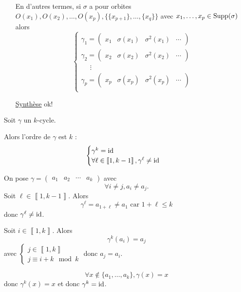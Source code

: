 \begin{prv}
\begin{itemize}
			En d'autres termes, si $\sigma$ a pour orbites $O(x_1), O(x_2), \ldots, O(x_p), \{\{x_{p+1}\},\ldots, \{x_q\}\}$ avec $x_1, \ldots, x_p \in \operatorname{Supp}(\sigma)$ alors \[
				\begin{cases}
					\gamma_1 = \begin{pmatrix} x_1&\sigma(x_1)&\sigma^2(x_1)&\cdots \end{pmatrix} \\
					\gamma_2 = \begin{pmatrix} x_2&\sigma(x_2)&\sigma^2(x_2)&\cdots \end{pmatrix}\\
					~~~~~~\vdots\\
					\gamma_p = \begin{pmatrix} x_p&\sigma(x_p)&\sigma^2(x_p)&\cdots \end{pmatrix} \\
				\end{cases}
			\]
		\item[\underline{\sc Synthèse}] ok!
	\end{itemize}
\end{prv}

\begin{prop}
	Soit $\gamma$ un $k$-cycle.

	Alors l'ordre de $\gamma$ est $k$ : \[
		\begin{cases}
			\gamma^{k}= \operatorname{id}\\
			\forall \ell \in \left\llbracket 1,k-1 \right\rrbracket, \gamma^{\ell} \neq \operatorname{id}
		\end{cases}
	\]
\end{prop}

\begin{prv}
	On pose $\gamma = \begin{pmatrix}
		a_1&a_2&\cdots&a_k
	\end{pmatrix}$ avec \[
		\forall i \neq j, a_i \neq a_j.
	\] Soit $\ell \in \left\llbracket 1,k-1 \right\rrbracket$. Alors \[
		\gamma^{\ell} = a_{1+\ell} \neq a_1 \text{ car } 1 + \ell \le k
	\] donc $\gamma^{\ell} \neq \operatorname{id}$.

	Soit $i \in \left\llbracket 1,k \right\rrbracket$. Alors \[
		\gamma^{k}(a_i) = a_j
	\] avec $\begin{cases}
		j \in \left\llbracket 1,k \right\rrbracket\\
		j \equiv i + k \mod k
	\end{cases}$ donc $a_j = a_i$.

	\[
		\forall x \not\in \{a_1, \ldots, a_k\}, \gamma(x) = x
	\] donc $\gamma^{k}(x) = x$ et donc $\gamma^{k} = \operatorname{id}$.
\end{prv}

